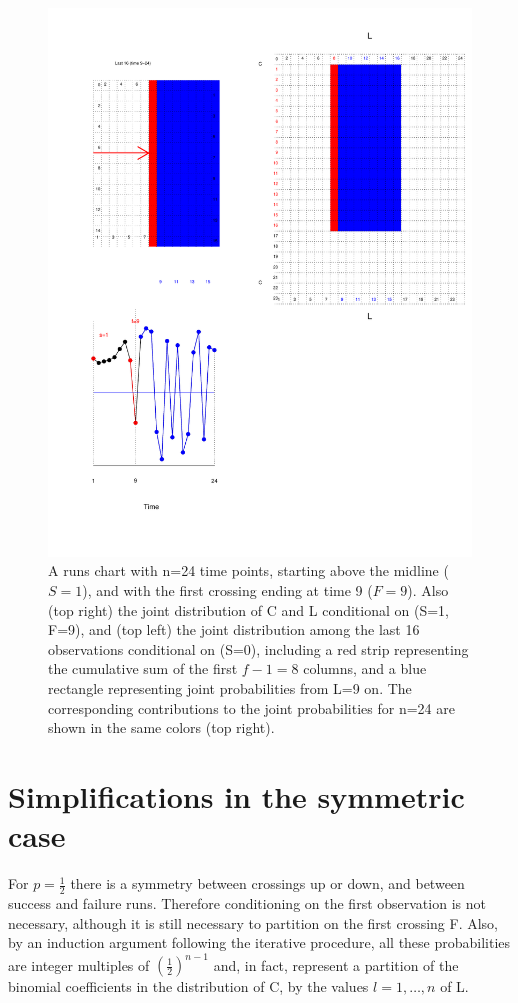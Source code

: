 \begin{figure}[htbp]
  \centering
  \caption{A runs chart with n=24 time points, starting above the 
  midline ($S=1$), and with the first crossing ending at time 9 ($F=9$). Also (top right) the joint distribution of C and L conditional on (S=1, F=9), and (top left) the joint distribution among the last 16 observations conditional on (S=0), including a red strip representing the cumulative sum of the first $f-1=8$ columns, and a blue rectangle representing joint probabilities from L=9 on. The corresponding contributions to the joint probabilities for n=24 are shown in the same colors (top right).}
  \label{figure:rch2}
  \includegraphics{run24case2}
\end{figure}

\section{Simplifications in the symmetric case}

For $p=\frac{1}{2}$ there is a symmetry between crossings up or down, and between success and failure runs. Therefore conditioning on the first observation is not necessary, although it is still necessary to partition on the first crossing F. Also, by an induction argument following the iterative procedure, all these probabilities are integer multiples of ${\left( \frac{1}{2} \right)}^{n-1}$ and, in fact, represent a partition of the binomial coefficients in the distribution of C, by the values $l=1, \ldots ,n$ of L.  

